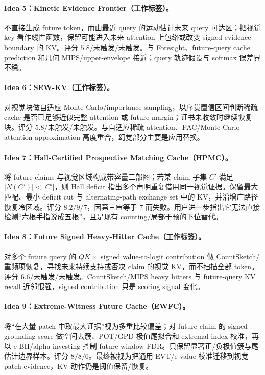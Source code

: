 \documentclass[UTF8,zihao=-4,a4paper]{ctexart}
\begin{document}
\paragraph{Idea 5：Kinetic Evidence Frontier（工作标签）。}
不直接生成 future token，而由最近 query 的运动估计未来 query 可达区；把视觉 key 看作线性函数，保留可能进入未来 attention 上包络或改变 signed evidence boundary 的 KV。评分 $5.8$/未触发/未触发。与 Foresight、future-query cache prediction 和几何 MIPS/upper-envelope 接近；query 轨迹假设与 softmax 误差界不稳。

\paragraph{Idea 6：SEW-KV（工作标签）。}
对视觉块做自适应 Monte-Carlo/importance sampling，以序贯置信区间判断稀疏 cache 是否已足够近似完整 attention 或 future margin；证书未收敛时继续恢复块。评分 $5.8$/未触发/未触发。与自适应稀疏 attention、PAC/Monte-Carlo attention approximation 高度重合，幻觉部分主要是应用替换。

\paragraph{Idea 7：Hall-Certified Prospective Matching Cache（HPMC）。}
将 future claims 与视觉区域构成带容量二部图；若某 claim 子集 $C'$ 满足 $|N(C')|<|C'|$，则 Hall deficit 指出多个声明重复借用同一视觉证据。保留最大匹配、最小 deficit cut 与 alternating-path exchange set 中的 KV，并沿增广路径恢复冷区域。评分 $8.2/9/7$，因第三审等于 7 而失败。用户进一步指出它无法直接检测“六根手指说成五根”，且是现有 counting/局部干预的下位替代。

\paragraph{Idea 8：Future Signed Heavy-Hitter Cache（工作标签）。}
对多个 future query 的 $QK\times$ signed value-to-logit contribution 做 CountSketch/重频项恢复，寻找未来持续支持或否决 claim 的视觉 KV，而不扫描全部 token。评分 $6.6$/未触发/未触发。CountSketch/MIPS heavy hitters 与 future-query KV recall 近邻很强，signed contribution 只是 scoring signal 变化。

\paragraph{Idea 9：Extreme-Witness Future Cache（EWFC）。}
将“在大量 patch 中取最大证据”视为多重比较偏差；对 future claim 的 signed grounding score 做空间去簇、POT/GPD 极值尾拟合和 extremal-index 校准，再以 e-BH/alpha-investing 控制 future-window FDR。只保留显著正/负极值簇与尾估计边界样本。评分 $8/8/6$。最终被视为把通用 EVT/e-value 校准迁移到视觉 patch evidence，KV 动作仍是阈值保留/恢复。
\end{document}
